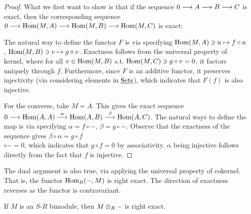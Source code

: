 \begin{proof}
    What we first want to show is that if the sequence $0 \longrightarrow A \longrightarrow B \longrightarrow C$ is exact, then the corresponding sequence $0 \longrightarrow \mathrm{Hom}(M, A) \longrightarrow \mathrm{Hom}(M, B) \longrightarrow \mathrm{Hom}(M, C)$ is exact:
    \begin{figure}[htbp]
        \centering
    \end{figure}
    The natural way to define the functor $F$ is via specifying $\mathrm{Hom}(M, A) \ni u \mapsto f \circ u$, $\mathrm{Hom}(M, B) \ni v \mapsto g \circ v$. Exactness follows from the universal property of kernel, where for all $v \in \mathrm{Hom}(M, B)$ s.t. $\mathrm{Hom}(M, C) \ni g \circ v = 0$, it factors uniquely through $f$. Furthermore, since $F$ is an additive functor, it preserves injectivity (via considering elements in $\underline{\textup{Sets}}$), which indicates that $F(f)$ is also injective.

    For the converse, take $M = A$. This gives the exact sequence $0 \longrightarrow \mathrm{Hom} (A, A) \overset{\alpha}{\longrightarrow} \mathrm{Hom}(A, B) \overset{\beta}{\longrightarrow} \mathrm{Hom}(A, C)$. The natural ways to define the map is via specifying $\alpha = f \circ -$, $\beta = g \circ -$. Observe that the exactness of the sequence gives $\beta \circ \alpha = g \circ f $ \\ $\circ - = 0$, which indicates that $g \circ f = 0$ by associativity. $\alpha$ being injective follows directly from the fact that $f$ is injective.
\end{proof}

\begin{remark}
    The dual argument is also true, via applying the universal property of cokernel. That is, the functor $\mathrm{Hom}_R(-, M)$ is right exact. The direction of exactness reverses as the functor is contravariant. 
\end{remark}

\begin{proposition}\label{prop:tensor product functor right exact}
    If $M$ is an $S$-$R$ bimodule, then $M \otimes_R -$ is right exact. 
\end{proposition}

